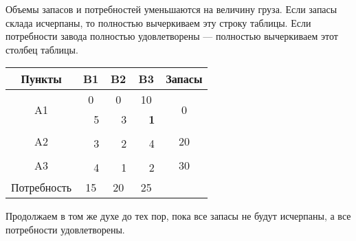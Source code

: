 \documentclass[a4paper,12pt]{article}
\begin{document}
	Объемы запасов и потребностей уменьшаются на величину груза. Если запасы склада исчерпаны, то полностью вычеркиваем эту строку таблицы. Если потребности завода полностью удовлетворены — полностью вычеркиваем этот столбец таблицы.
	
	\begin{center}
		\begin{tabular}{|c|c|c|c|c|c|c|c}
			\hline
			Пункты & \multicolumn{2}{c|}{B1} & \multicolumn{2}{c|}{B2} & \multicolumn{2}{c|}{B3} & \multicolumn{1}{c|}{Запасы} \\ \hline
			\multirow{2}{*}{A1} & \multicolumn{2}{c|}{0} & \multicolumn{2}{c|}{0} & \multicolumn{2}{c|}{10} & \multicolumn{1}{c|}{\multirow{2}{*}{0}} \\ \cline{2-7}
			&  & 5 &  & 3 &  & \textbf{1} & \multicolumn{1}{c|}{} \\ \hline
			\multirow{2}{*}{A2} & \multicolumn{2}{c|}{\textbf{}} & \multicolumn{2}{c|}{\textbf{}} & \multicolumn{2}{c|}{} & \multicolumn{1}{c|}{\multirow{2}{*}{20}} \\ \cline{2-7}
			&  & 3 &  & 2 &  & 4 & \multicolumn{1}{c|}{} \\ \hline
			\multirow{2}{*}{A3} & \multicolumn{2}{c|}{} & \multicolumn{2}{c|}{} & \multicolumn{2}{c|}{\textbf{}} & \multicolumn{1}{c|}{\multirow{2}{*}{30}} \\ \cline{2-7}
			&  & 4 &  & 1 &  & 2 & \multicolumn{1}{c|}{} \\ \hline
			Потребность & \multicolumn{2}{c|}{15} & \multicolumn{2}{c|}{20} & \multicolumn{2}{c|}{25} &  \\ \cline{1-7}
		\end{tabular}
	\end{center}

	Продолжаем в том же духе до тех пор, пока все запасы не будут исчерпаны, а все потребности удовлетворены.
	
\end{document}
